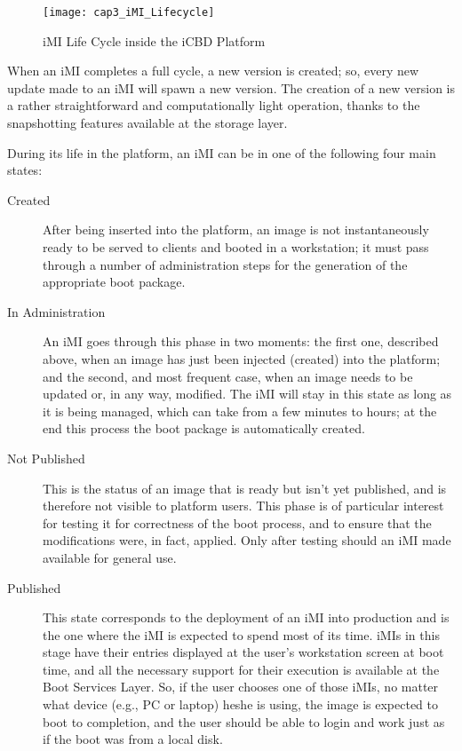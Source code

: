 \begin{figure}[htbp]
	\centering
	\texttt{[image: cap3\_iMI\_Lifecycle]}
	\caption{iMI Life Cycle inside the iCBD Platform}
	\label{fig:icbd_iMI_lifecycle}
\end{figure}

When an iMI completes a full cycle, a new version is created; so, every new update made to an iMI will spawn a new version. The creation of a new version is a rather straightforward and computationally light operation, thanks to the snapshotting features available at the storage layer.

During its life in the platform, an iMI can be in one of the following four main states:

\begin{description}
	\item [Created] After being inserted into the platform, an image is not instantaneously ready to be served to clients and booted in a workstation; it must pass through a number of administration steps for the generation of the appropriate boot package.
	\item [In Administration] An iMI goes through this phase in two moments: the first one, described above, when an image has just been injected (created) into the platform; and the second, and most frequent case, when an image needs to be updated or, in any way, modified. The iMI will stay in this state as long as it is being managed, which can take from a few minutes to hours; at the end this process the boot package is automatically created.
	\item [Not Published] This is the status of an image that is ready but isn’t yet published, and is therefore not visible to platform users. This phase is of particular interest for testing it for correctness of the boot process, and to ensure that the modifications were, in fact, applied. Only after testing should an iMI made available for general use.
	\item [Published] This state corresponds to the deployment of an iMI into production and is the one where the iMI is expected to spend most of its time. iMIs in this stage have their entries displayed at the user’s workstation screen at boot time, and all the necessary support for their execution is available at the Boot Services Layer. So, if the user chooses one of those iMIs, no matter what device (e.g., PC or laptop) he\/she is using, the image is expected to boot to completion, and the user should be able to login and work just as if the boot was from a local disk.
\end{description}

